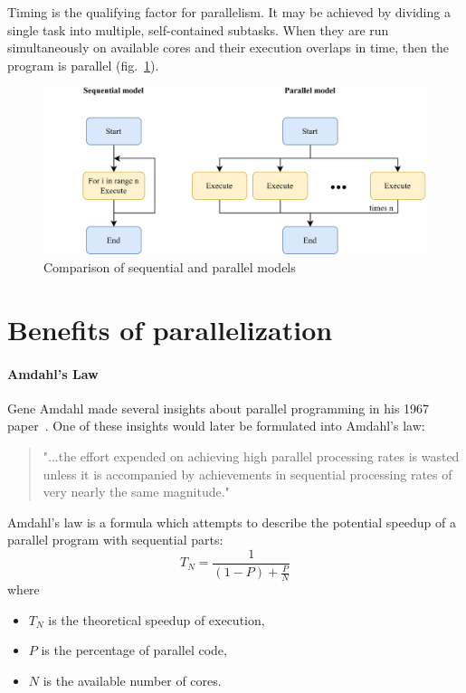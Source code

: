Timing is the qualifying factor for parallelism. It may be achieved by dividing a single task into multiple, self-contained subtasks. When they are run simultaneously on available cores and their execution overlaps in time, then the program is parallel (fig.~\ref{fig:seqvspar}).
\begin{figure}[htb]
	\centering
		\includegraphics[scale=1.0]{figures02/seqvspar.png}
		\caption{Comparison of sequential and parallel models}
	\label{fig:seqvspar}
\end{figure}

\section{Benefits of parallelization}
\paragraph{Amdahl's Law\newline}
Gene Amdahl made several insights about parallel programming in his 1967 paper~\cite{Amdahl1967}. One of these insights would later be formulated into Amdahl's law:
\begin{quotation}
"...the effort expended on achieving high parallel processing rates is wasted unless it is accompanied by achievements in sequential processing rates of very nearly the same magnitude."
\end{quotation}
Amdahl's law is a formula which attempts to describe the potential speedup of a parallel program with sequential parts: 
\begin{equation}
T_N = \frac{1}{(1 - P) + \frac{P}{N}}
\end{equation}
where
\begin{itemize}
	\item $T_N$ is the theoretical speedup of execution,
	\item $P$ is the percentage of parallel code,
	\item $N$ is the available number of cores.
\end{itemize}

